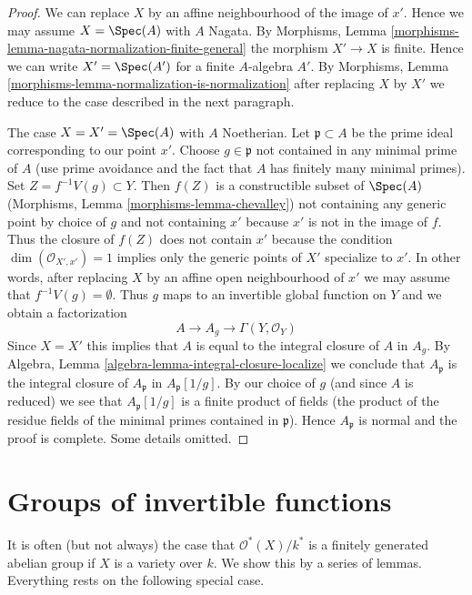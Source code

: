 \begin{proof}
We can replace $X$ by an affine neighbourhood of the image of $x'$.
Hence we may assume $X = \Spec(A)$ with $A$ Nagata.
By Morphisms, Lemma \ref{morphisms-lemma-nagata-normalization-finite-general}
the morphism $X' \to X$ is finite. Hence we can write
$X' = \Spec(A')$ for a finite $A$-algebra $A'$.
By Morphisms, Lemma \ref{morphisms-lemma-normalization-is-normalization}
after replacing $X$ by $X'$
we reduce to the case described in the next paragraph.

\medskip\noindent
The case $X = X' = \Spec(A)$ with $A$ Noetherian.
Let $\mathfrak p \subset A$ be the prime ideal
corresponding to our point $x'$. Choose $g \in \mathfrak p$
not contained in any minimal prime of $A$ (use prime avoidance
and the fact that $A$ has finitely many minimal primes).
Set $Z = f^{-1}V(g) \subset Y$.
Then $f(Z)$ is a constructible subset of $\Spec(A)$
(Morphisms, Lemma \ref{morphisms-lemma-chevalley})
not containing any generic point by choice of $g$
and not containing $x'$ because $x'$ is not in the image of $f$.
Thus the closure of $f(Z)$ does not contain $x'$ because
the condition $\dim(\mathcal{O}_{X', x'}) = 1$ implies only
the generic points of $X'$ specialize to $x'$.
In other words, after replacing $X$ by an affine open
neighbourhood of $x'$ we may assume that $f^{-1}V(g) = \emptyset$.
Thus $g$ maps to an invertible global function on $Y$ and
we obtain a factorization
$$
A \to A_g \to \Gamma(Y, \mathcal{O}_Y)
$$
Since $X = X'$ this implies that $A$ is equal to the integral
closure of $A$ in $A_g$. By
Algebra, Lemma \ref{algebra-lemma-integral-closure-localize}
we conclude that $A_\mathfrak p$ is the integral closure
of $A_\mathfrak p$ in $A_\mathfrak p[1/g]$.
By our choice of $g$ (and since $A$ is reduced) we see
that $A_\mathfrak p[1/g]$ is a finite product of fields
(the product of the residue fields of the minimal primes
contained in $\mathfrak p$). Hence $A_\mathfrak p$ is
normal and the proof is complete. Some details omitted.
\end{proof}




\section{Groups of invertible functions}
\label{section-units}

\noindent
It is often (but not always) the case that $\mathcal{O}^*(X)/k^*$
is a finitely generated abelian group if $X$ is a variety over $k$.
We show this by a series of lemmas.
Everything rests on the following special case.

